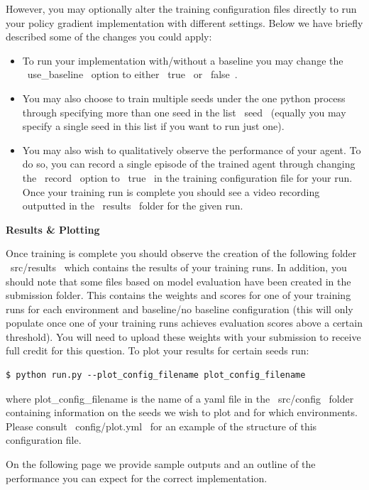 However, you may optionally alter the training configuration files directly to run your policy gradient implementation with different settings. Below we have briefly described some of the changes you could apply:

\begin{itemize}
\item To run your implementation with/without a baseline you may change the ~use_baseline~ option to either ~true~ or ~false~.

\item You may also choose to train multiple seeds under the one python process through specifying more than one seed in the list ~seed~ (equally you may specify a single seed in this list if you want to run just one).

\item You may also wish to qualitatively observe the performance of your agent. To do so, you can record a single episode of the trained agent through changing the ~record~ option to ~true~ in the training configuration file for your run. Once your training run is complete you should see a video recording outputted in the ~results~ folder for the given run.
\end{itemize}

\textbf{Results \& Plotting}

Once training is complete you should observe the creation of the following folder ~src/results~ which contains the results of your training runs. In addition, you should note that some files based on model evaluation have been created in the submission folder. This contains the weights and scores for one of your training runs for each environment and baseline/no baseline configuration (this will only populate once one of your training runs achieves evaluation scores above a certain threshold). You will need to upload these weights with your submission to receive full credit for this question. To plot your results for certain seeds run:

\begin{lstlisting}
$ python run.py --plot_config_filename plot_config_filename
\end{lstlisting}

where plot\_config\_filename is the name of a yaml file in the ~src/config~ folder containing information on the seeds we wish to plot and for which environments. Please consult ~config/plot.yml~ for an example of the structure of this configuration file.

On the following page we provide sample outputs and an outline of the performance you can expect for the correct implementation.

